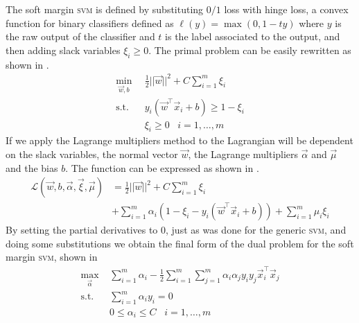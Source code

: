 The soft margin \textsc{svm} is defined by substituting $0/1$ loss with hinge loss, a convex function for binary
classifiers defined as $\ell(y) = \max(0, 1 - ty)$ where $y$ is the raw output of the classifier and
$t$ is the label associated to the output, and then adding slack variables $\xi_i \geq 0$. The primal problem can be easily rewritten as shown in .
\begin{equation}
	\label{eq:sm-primal-final}
	\begin{aligned}
		\min_{\vec{w}, b}         & \frac{1}{2}||\vec{w}||^2 + C\sum_{i = 1}^m \xi_i \\
		\text{s.t.} \hspace{10pt} & y_i(\vec{w}^\top\vec{x}_i + b) \geq 1 - \xi_i    \\
		                          & \xi_i \geq 0 \hspace{10pt}i = 1, \ldots, m
	\end{aligned}
\end{equation}
If we apply the Lagrange multipliers method to  the Lagrangian will be
dependent on the slack variables, the normal vector $\vec{w}$, the Lagrange multipliers
$\vec{\alpha}$ and $\vec{\mu}$ and the bias $b$. The function can be expressed as shown in
.
\begin{equation}
	\label{eq:sm-lagrangian}
	\begin{aligned}
		\mathcal{L}(\vec{w}, b, \vec{\alpha}, \vec{\xi}, \vec{\mu}) & =
		\frac{1}{2}||\vec{w}||^2 + C\sum_{i = 1}^m \xi_i                                                                                                               \\
		                                                            & + \sum_{i = 1}^m \alpha_i(1 - \xi_i - y_i(\vec{w}^\top\vec{x}_i + b)) + \sum_{i = 1}^m\mu_i\xi_i
	\end{aligned}
\end{equation}
By setting the partial derivatives to $0$, just as was done for the generic \textsc{svm}, and doing
some substitutions we obtain the final form of the dual problem for the soft margin \textsc{svm}, shown in
\begin{equation}
	\label{eq:sm-dual-final}
	\begin{aligned}
		\max_{\vec{\alpha}}       & \sum_{i = 1}^m \alpha_i - \frac{1}{2}\sum_{i = 1}^m\sum_{j =
		1}^m\alpha_i\alpha_jy_iy_j\vec{x}_i^\top\vec{x}_j                                        \\
		\text{s.t.} \hspace{10pt} & \sum_{i = 1}^m\alpha_iy_i = 0                                \\
		                          & 0 \leq \alpha_i \leq C \hspace{10pt} i = 1, \ldots, m
	\end{aligned}
\end{equation}
